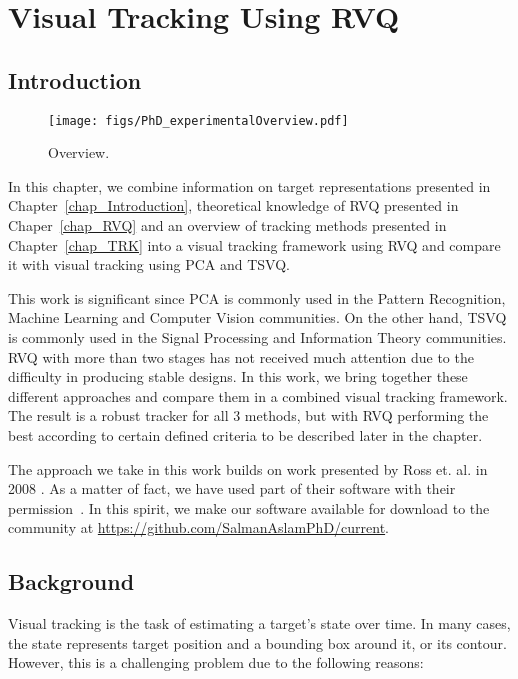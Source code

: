 \chapter{Visual Tracking Using RVQ}
\label{chap_RVQ_TRK}	

\section{Introduction}
								\begin{figure}[t]
								\centering
								\texttt{[image: figs/PhD\_experimentalOverview.pdf]}
								\caption{Overview.}
								\label{fig:overview}
								\end{figure}

In this chapter, we combine information on target representations presented in Chapter~\ref{chap_Introduction}, theoretical knowledge of RVQ presented in Chaper~\ref{chap_RVQ} and an overview of tracking methods presented in Chapter~\ref{chap_TRK} into a visual tracking framework using RVQ and compare it with visual tracking using PCA and TSVQ.  

This work is significant since PCA is commonly used in the Pattern Recognition, Machine Learning and Computer Vision communities.  On the other hand, TSVQ is commonly used in the Signal Processing and Information Theory communities.  RVQ with more than two stages has not received much attention due to the difficulty in producing stable designs.  In this work, we bring together these different approaches and compare them in a combined visual tracking framework.  The result is a robust tracker for all 3 methods, but with RVQ performing the best according to certain defined criteria to be described later in the chapter.



The approach we take in this work builds on work presented by Ross et. al. in 2008 \cite{2008_JNL_subspaceTRK_Ross}.  As a matter of fact, we have used part of their software with their permission~\cite{2008_SFT_Ross}.  In this spirit, we make our software available for download to the community at \url{https://github.com/SalmanAslamPhD/current}.  

\section{Background}
Visual tracking is the task of estimating a target's state over time.  In many cases, the state represents target position and a bounding box around it, or its contour.  However, this is a challenging problem due to the following reasons:

